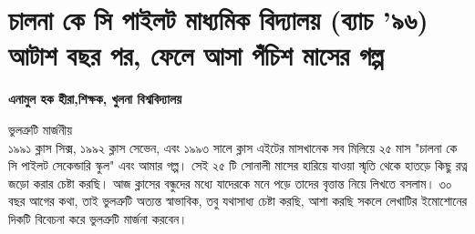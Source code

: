 \documentclass{report}
\begin{document}
 

\section{চালনা কে সি পাইলট মাধ্যমিক বিদ্যালয় (ব্যাচ ’৯৬)
আটাশ বছর পর, ফেলে আসা পঁচিশ মাসের গল্প}
\textbf{এনামুল হক হীরা,শিক্ষক, খুলনা বিশ্ববিদ্যালয়}

\noindent ভুলত্রুটি মার্জনীয় \\

১৯৯১ ক্লাস সিক্স, ১৯৯২ ক্লাস সেভেন, এবং ১৯৯৩ সালে ক্লাস এইটের মাসখানেক সব মিলিয়ে ২৫ মাস "চালনা কে সি পাইলট সেকেন্ডারি স্কুল" এবং আমার গল্প। সেই ২৫ টি সোনালী মাসের হারিয়ে যাওয়া স্মৃতি থেকে হাতড়ে কিছু রত্ন জড়ো করার চেষ্টা করছি। আজ ক্লাসের বন্ধুদের মধ্যে যাদেরকে মনে পড়ে তাদের বৃত্তান্ত নিয়ে লিখতে বসলাম। ৩০ বছর আগের কথা, তাই ভুলত্রুটি অত্যন্ত স্বাভাবিক, তবু যথাসাধ্য চেষ্টা করছি, আশা করছি সকলে লেখাটির ইমোশোনের দিকটি বিবেচনা করে ভুলত্রুটি মার্জনা করবেন।
\end{document}
